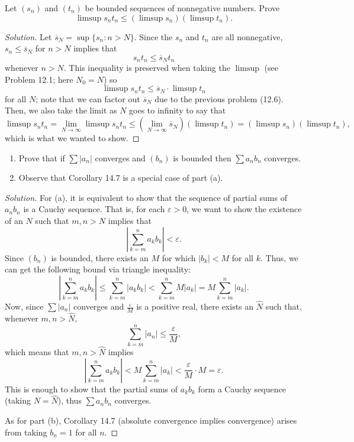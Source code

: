 \documentclass[11pt]{scrartcl}
\providecommand{\ol}{\overline}
\providecommand{\eps}{\varepsilon}
\providecommand{\ii}{\item}
\theoremstyle{problem}
\newenvironment{problem}[1]
{\renewcommand\theinnercustomthm{#1}\innercustomthm}
{\endinnercustomthm}
\theoremstyle{remark}
\newenvironment{soln}{\begin{proof}[Solution]}{\end{proof}}
\providecommand{\abs}[1]{\left|#1\right|}
\begin{document}
\begin{problem}{12.8}
	Let $(s_n)$ and $(t_n)$ be bounded sequences of nonnegative numbers.
	Prove
	\[\limsup s_nt_n\le (\limsup s_n)(\limsup t_n).\]
\end{problem}

\begin{soln}
	Let $\ol s_N = \sup\{s_n : n > N\}$.
	Since the $s_n$ and $t_n$ are all nonnegative,
	$s_n \le \ol s_N$ for $n > N$ implies that
	\[s_nt_n \le \ol s_N t_n\]
	whenever $n > N$.
	This inequality is preserved when taking the $\limsup$
	(see Problem 12.1; here $N_0 = N$) so
	\[\limsup s_nt_n \le \ol s_N\cdot \limsup t_n\]
	for all $N$; note that we can factor out $\ol s_N$
	due to the previous problem (12.6).
	Then, we also take the limit as $N$ goes to infinity to say that
	\[\limsup s_nt_n = \lim_{N\to\infty} \limsup s_nt_n
	\le (\lim_{N\to\infty} \ol s_N)(\limsup t_n) = (\limsup s_n)(\limsup t_n),\]
	which is what we wanted to show.
\end{soln}

\begin{problem}{14.6}
	\begin{enumerate}[\textbf{(\alph*)}]
		\ii Prove that if $\sum |a_n|$ converges and $(b_n)$ is bounded
		then $\sum a_nb_n$ converges.
		\ii Observe that Corollary 14.7 is a special case of part (a).
	\end{enumerate}
\end{problem}

\begin{soln}
	For (a), it is equivalent to show that the sequence of partial sums
	of $a_nb_n$ is a Cauchy sequence. That is, for each $\eps > 0$,
	we want to show the existence of an $N$ such that $m,n > N$ implies that
	\[\abs{\sum_{k=m}^n a_kb_k} < \eps.\]
	Since $(b_n)$ is bounded, there exists an $M$ for which $|b_k| < M$
	for all $k$. Thus, we can get the following bound via triangle inequality:
	\[\abs{\sum_{k=m}^n a_kb_k} \le \sum_{k=m}^n\abs{a_kb_k}
	< \sum_{k=m}^nM\abs{a_k} = M\sum_{k=m}^n \abs{a_k}.\]
	Now, since $\sum|a_n|$ converges and $\frac\eps M$ is a positive real,
	there exists an $\hat N$ such that, whenever $m, n > \hat N$,
	\[\sum_{k = m}^n |a_n| \le \frac{\eps}{M},\]
	which means that $m, n > \hat N$ implies
	\[\abs{\sum_{k=m}^n a_kb_k}
	< M\sum_{k=m}^n\abs{a_k} < \frac\eps{M}\cdot M = \eps.\]
	This is enough to show that the partial sums of $a_kb_k$
	form a Cauchy sequence (taking $N = \hat N$), thus $\sum a_nb_n$ converges.
	
	As for part (b), Corollary 14.7 (absolute convergence implies convergence)
	arises from taking $b_n = 1$ for all $n$.
\end{soln}
\end{document}
